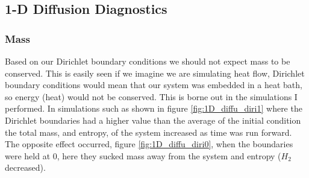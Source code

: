 \documentclass[]{article}
\begin{document}
\subsection{1-D Diffusion Diagnostics}
\subsubsection{Mass}
Based on our Dirichlet boundary conditions we should not expect mass to be conserved. This is easily seen if we imagine we are simulating heat flow, Dirichlet boundary conditions would mean that our system was embedded in a heat bath, so energy (heat) would not be conserved. This 
is borne out in the simulations I performed. In simulations such as shown in figure \ref{fig:1D_diffu_diri1} where the Dirichlet boundaries had a higher value than the average of the initial condition the total mass, and entropy, of the system increased as time was run forward. The opposite effect occurred, figure \ref{fig:1D_diffu_diri0}, when the boundaries were held at 0, here they sucked mass away from the system and entropy ($H_2$ decreased).  
\end{document}
